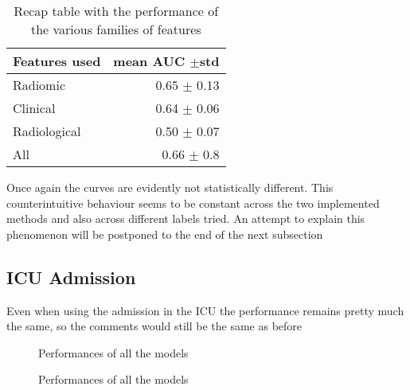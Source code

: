 \begin{table}
\caption{Recap table with the performance of the various families of features \label{tab:RecapDeathRF}}
\centering
\begin{tabular}{l|r}
\toprule
Features used & mean AUC $\pm$std\\
\midrule
Radiomic  & 0.65 $\pm$ 0.13\\
Clinical  &  0.64 $\pm$ 0.06\\
Radiological & 0.50 $\pm$ 0.07\\
All & 0.66 $\pm$ 0.8 \\
\bottomrule
\end{tabular}
\end{table}

Once again the curves are evidently not statistically different. This counterintuitive behaviour seems to be constant across the two implemented methods and also across different labels tried. An attempt to explain this phenomenon will be postponed to the end of the next subsection

\subsection{ICU Admission}
Even when using the admission in the ICU the performance remains pretty much the same, so the comments would still be the same as before

\begin{figure}[H]
\centering
	\newline
        \caption{Performances of all the models}\label{fig:RFicu}
\end{figure}


\begin{figure}[H]
\centering
	\newline
        \caption{Performances of all the models}\label{fig:RFicuROC}
\end{figure}


